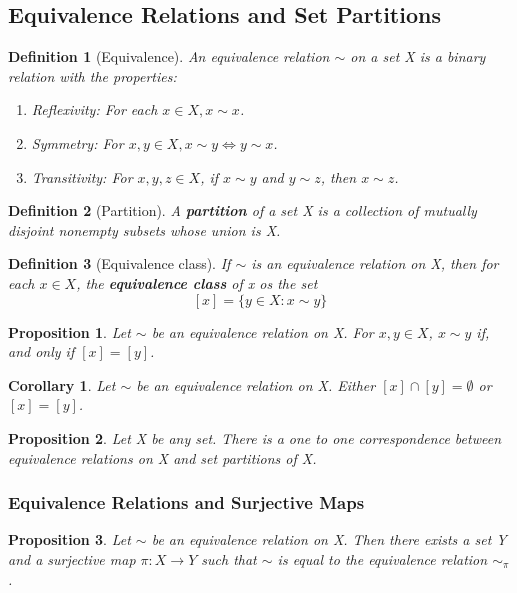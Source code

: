 \documentclass[12pt]{article}
\newtheorem{definition}{Definition}[subsection]
\newtheorem{proposition}{Proposition}[subsection]
\newtheorem{corollary}{Corollary}[subsection]
\begin{document}
    \subsection{Equivalence Relations and Set Partitions}
    \begin{definition}[Equivalence]
        An equivalence relation $\sim$ on a set X is a binary relation with the properties:
        \begin{enumerate}
            \item Reflexivity: For each $x \in X, x \sim x$.
            \item Symmetry: For $x, y \in X, x \sim y \Leftrightarrow y \sim x$.
            \item Transitivity: For $x, y, z \in X$, if $x \sim y$ and $y \sim z$, then $x \sim z$.
        \end{enumerate}

    \end{definition}
    
    \begin{definition}[Partition]
        A \textbf{partition} of a set X is a collection of mutually disjoint nonempty subsets whose union is X.
    \end{definition}
    
    \begin{definition}[Equivalence class]
        If $\sim$ is an equivalence relation on X, then for each $x \in X$, the \textbf{equivalence class} of x os the set
        \[[x]=\{y \in X: x\sim y\}\]
    \end{definition}
    \begin{proposition}
        Let $\sim$ be an equivalence relation on X. For $x, y \in X$, $x \sim y$ if, and only if $[x]=[y]$.
    \end{proposition}
    \begin{corollary}
        Let $\sim$ be an equivalence relation on X. Either $[x] \cap [y] = \emptyset$ or $[x] = [y]$.
    \end{corollary}

    \begin{proposition}
        Let X be any set. There is a one to one correspondence between equivalence relations on X and set partitions of X.
    \end{proposition}
    \subsubsection{Equivalence Relations and Surjective Maps}
    \begin{proposition}
        Let $\sim$ be an equivalence relation on X. Then there exists a set Y and a surjective map $\pi: X \rightarrow Y$ such that $\sim$ is equal to the equivalence relation $\sim_{\pi}$.
    \end{proposition}
\end{document}
